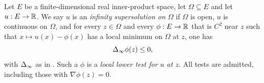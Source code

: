 \begin{definition}
Let $E$ be a finite-dimensional real inner-product space, let $\Omega\subseteq E$
and let $u:E\to\mathbb{R}$. We say $u$ is an \emph{infinity supersolution on $\Omega$} if
$\Omega$ is open, $u$ is continuous on $\Omega$, and for every $z\in\Omega$ and
every $\phi:E\to\mathbb{R}$ that is $C^2$ near $z$ such that $x\mapsto u(x)-\phi(x)$ has
a local minimum on $\Omega$ at $z$, one has
\[
  \Delta_{\infty}\phi(z)\le0 ,
\]
with $\Delta_{\infty}$ as in . Such a $\phi$ is a \emph{local lower test
for $u$ at $z$}. All tests are admitted, including those with
$\nabla\phi(z)=0$.
\end{definition}
